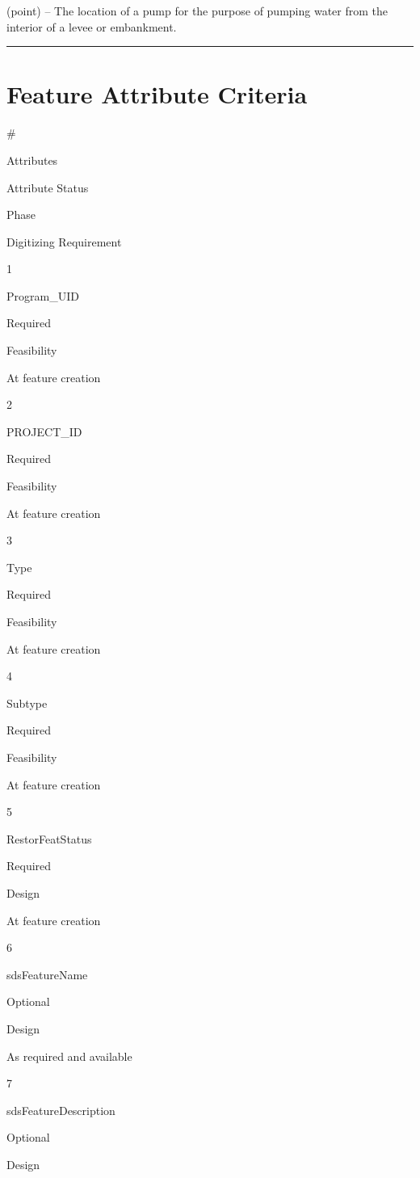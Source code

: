 \documentclass[
  letterpaper,
  DIV=11,
  numbers=noendperiod]{scrreprt}
\begin{document}
(point) -- The location of a pump for the purpose of pumping water from
the interior of a levee or embankment.

\begin{center}\rule{0.5\linewidth}{0.5pt}\end{center}

\section{Feature Attribute
Criteria}\label{feature-attribute-criteria-10}

\#

Attributes

Attribute Status

Phase

Digitizing Requirement

1

Program\_UID

Required

Feasibility

At feature creation

2

PROJECT\_ID

Required

Feasibility

At feature creation

3

Type

Required

Feasibility

At feature creation

4

Subtype

Required

Feasibility

At feature creation

5

RestorFeatStatus

Required

Design

At feature creation

6

sdsFeatureName

Optional

Design

As required and available

7

sdsFeatureDescription

Optional

Design
\end{document}
